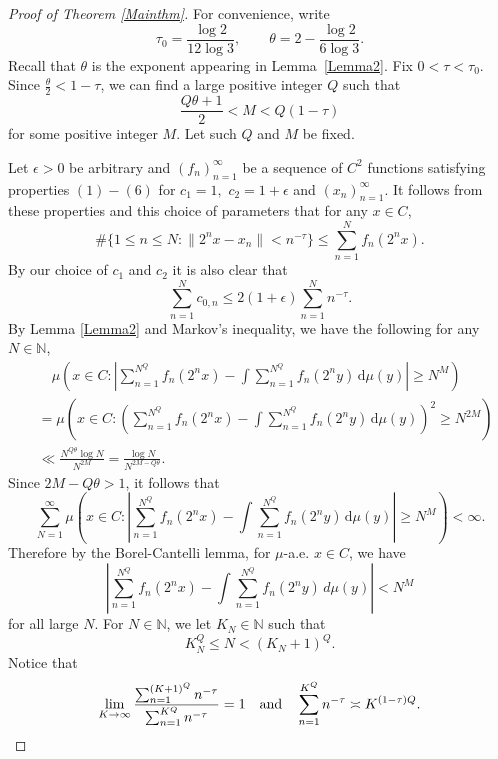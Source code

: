 \documentclass[amssymb,amsfonts,refcheck,12pt,verbatim,righttag]{amsart}
\numberwithin{equation}{section} %
\theoremstyle{plain}
\begin{document}
\begin{proof}[Proof of Theorem \ref{Mainthm}]
	For convenience, write 
	\[\tau_0=\frac{\log2}{12\log3},\qquad \theta=2-\frac{\log2}{6\log3}.\]
	Recall that $\theta$ is the exponent appearing in Lemma~\ref{Lemma2}. Fix $0<\tau<\tau_0$. %
    Since $\frac{\theta}{2}<1-\tau$,
	we can find a large positive integer $Q$ such that 
	\[\frac{Q\theta+1}{2}<M<Q(1-\tau)\]
	for some positive integer $M$. Let such $Q$ and $M$ be fixed. 
	
	
	Let $\epsilon>0$ be arbitrary and $(f_n)_{n=1}^{\infty}$ be a sequence of $C^2$ functions satisfying properties $(1)-(6)$ for $c_{1}=1,$ $c_{2}=1+\epsilon$ and $(x_{n})_{n=1}^{\infty}$. It follows from these properties and this choice of parameters that for any $x\in C$,
	\begin{equation}
		\label{Counting upper bound}
		\#\{1\leq n\leq N:\|2^{n}x-x_n\|< n^{-\tau}\}\leq \sum_{n=1}^{N}f_{n}(2^{n}x).
	\end{equation}
	By our choice of $c_{1}$ and $c_{2}$ it is also clear that 
	\begin{equation}
		\label{abequation}
		\sum_{n=1}^{N}c_{0,n}\leq 2(1+\epsilon)\sum_{n=1}^{N}n^{-\tau}.
	\end{equation}
	By Lemma \ref{Lemma2} and Markov's inequality, we have the following for any $N\in\mathbb{N}$,
	\begin{align*}
		&\quad\mu\left(x\in C:\left|\sum_{n=1}^{N^{Q}}f_{n}(2^{n}x)-\int \sum_{n=1}^{N^{Q}}f_{n}(2^ny)\, \mathrm{d}\mu(y)\right|\geq N^{M}\right)\\
		&=\mu\left(x\in C:\left(\sum_{n=1}^{N^{Q}}f_{n}(2^{n}x)-\int \sum_{n=1}^{N^{Q}}f_{n}(2^ny)\, \mathrm{d}\mu(y)\right)^{2}\geq N^{2M}\right)\\
		&\ll \frac{N^{ Q\theta}\log N}{N^{2M}}
		=\frac{\log N}{N^{2M-Q\theta}}.
	\end{align*}
	Since $2M-Q\theta>1$, it follows that
	$$\sum_{N=1}^{\infty}\mu\left(x\in C:\left|\sum_{n=1}^{N^{Q}}f_{n}(2^{n}x)-\int \sum_{n=1}^{N^{Q}}f_{n}(2^ny)\, \mathrm{d}\mu(y)\right|\geq N^{M}\right)<\infty.$$
	Therefore by the  Borel-Cantelli lemma, for $\mu$-a.e. $x\in C$, we have 
	\begin{equation}
		\label{eventually}
		\left|\sum_{n=1}^{N^{Q}}f_{n}(2^{n}x)-\int \sum_{n=1}^{N^{Q}}f_{n}(2^ny)\, d\mu(y)\right|<N^{M}
	\end{equation} 
	for all large $N$. For $N\in\mathbb{N}$, we let $K_{N}\in\mathbb{N}$ such that
    \begin{equation}\label{defKN}
    K_{N}^{Q}\leq N< (K_{N}+1)^{Q}. 
    \end{equation}
	  Notice that
	\begin{equation}
		\label{Kasymptotics}\lim_{K\to\infty}\frac{\sum_{n=1}^{(K+1)^{Q}}n^{-\tau}}{\sum_{n=1}^{K^{Q}}n^{-\tau}}=1\quad {\rm and }\quad \sum_{n=1}^{K^{Q}}n^{-\tau}\asymp K^{(1-\tau)Q}.
	\end{equation} 
	 

\end{proof}
\end{document}
